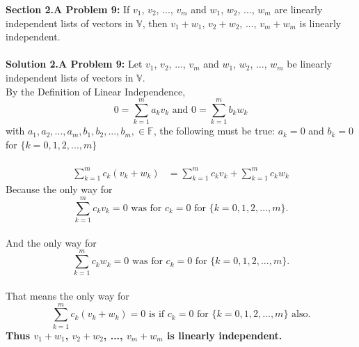 \documentclass[12pt]{article}
\begin{document}
\noindent \textbf{Section 2.A Problem 9: } If $v_1$, $v_2$, ..., $v_m$ and $w_1$, $w_2$, ..., $w_m$ are linearly independent lists of vectors in $\mathbb{V}$, then $v_1 + w_1$, $v_2 + w_2$, ..., $v_m + w_m$ is linearly independent. 
\\\\
\noindent \textbf{Solution 2.A Problem 9: } Let $v_1$, $v_2$, ..., $v_m$ and $w_1$, $w_2$, ..., $w_m$ be linearly independent lists of vectors in $\mathbb{V}$. 
\\
By the Definition of Linear Independence, $$ 0= \sum_{k=1}^{m} a_k v_k \text{ and } 0= \sum_{k=1}^{m} b_k w_k$$ with $a_1,a_2,...,a_m, b_1,b_2,...,b_m, \in \mathbb{F}$, the following must be true: $a_k = 0$ and $b_k = 0$ for $\{ k = 0,1,2,...,m\}$
\\\\
	\begin{align}
		\sum_{k=1}^{m} c_k (v_k + w_k) &= \sum_{k=1}^{m} c_k v_k + \sum_{k=1}^{m} c_k w_k
	\end{align}
Because the only way for $$ \sum_{k=1}^{m} c_k v_k  = 0 \text{ was for } c_k = 0 \text{ for } \{ k = 0,1,2,...,m\}.$$ \\
And the only way for $$ \sum_{k=1}^{m} c_k w_k  = 0 \text{ was for } c_k = 0 \text{ for } \{ k = 0,1,2,...,m\}.$$ \\
That means the only way for $$ \sum_{k=1}^{m} c_k (v_k + w_k)  = 0 \text{ is if } c_k = 0 \text{ for } \{ k = 0,1,2,...,m\} \text{ also.}$$
\textbf{Thus \boldmath $v_1 + w_1$, $v_2 + w_2$, ..., $v_m + w_m$ is linearly independent.}


\newpage
\end{document}

